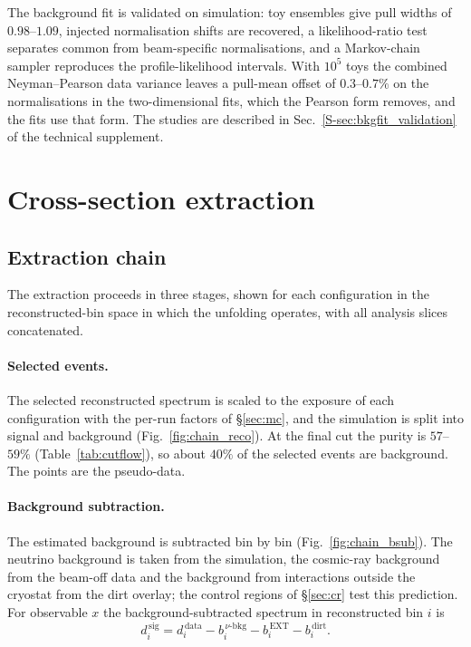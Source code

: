 \documentclass[11pt,a4paper]{article}
\newcommand{\suppref}[2]{#1~\ref{S-#2} of the technical supplement}
\begin{document}
The background fit is validated on simulation: toy ensembles give
pull widths of $0.98$--$1.09$, injected normalisation shifts are recovered, a likelihood-ratio test
separates common from beam-specific normalisations, and a Markov-chain sampler reproduces the
profile-likelihood intervals. With $10^5$ toys the combined Neyman--Pearson data variance leaves a
pull-mean offset of $0.3$--$0.7\%$ on the normalisations in the two-dimensional fits, which the
Pearson form removes, and the fits use that form. The studies are described in
\suppref{Sec.}{sec:bkgfit_validation}.


\section{Cross-section extraction}
\label{sec:unfolding}

\subsection{Extraction chain}
\label{sec:chain}

The extraction proceeds in three stages, shown for each configuration in the reconstructed-bin
space in which the unfolding operates, with all analysis slices concatenated.

\paragraph{Selected events.} The selected reconstructed spectrum is scaled to the exposure of each
configuration with the per-run factors of \S\ref{sec:mc}, and the simulation is split into signal
and background (Fig.~\ref{fig:chain_reco}). At the final cut the purity is $57$--$59\%$
(Table~\ref{tab:cutflow}), so about $40\%$ of the selected events are background. The points are
the pseudo-data.

\paragraph{Background subtraction.} The estimated background is subtracted bin by bin
(Fig.~\ref{fig:chain_bsub}). The neutrino background is taken from the simulation, the cosmic-ray
background from the beam-off data and the background from interactions outside the cryostat from
the dirt overlay; the control regions of \S\ref{sec:cr} test this prediction. For observable $x$
the background-subtracted spectrum in reconstructed bin $i$ is
\begin{equation}
  d_i^{\,\mathrm{sig}} = d_i^{\,\mathrm{data}} - b_i^{\,\nu\text{-bkg}}
                          - b_i^{\,\mathrm{EXT}} - b_i^{\,\mathrm{dirt}} .
\end{equation}
\end{document}
